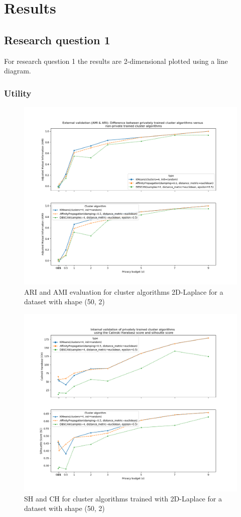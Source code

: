 \section{Results}
\subsection{Research question 1}
For research question 1 the results are 2-dimensional plotted using a line diagram.

\subsubsection{Utility}
\begin{figure}[!htb]
  \includegraphics[width=1\linewidth]{Results/rq1/ami-and-ari.png}
  \caption{ARI and AMI evaluation for cluster algorithms 2D-Laplace for a dataset with shape (50, 2)}
\end{figure}
\begin{figure}[!htb]
  \includegraphics[width=1\linewidth]{Results/rq1/ch-and-sc.png}
  \caption{SH and CH for cluster algorithms trained with 2D-Laplace for a dataset with shape (50, 2)}
\end{figure}
\newpage
